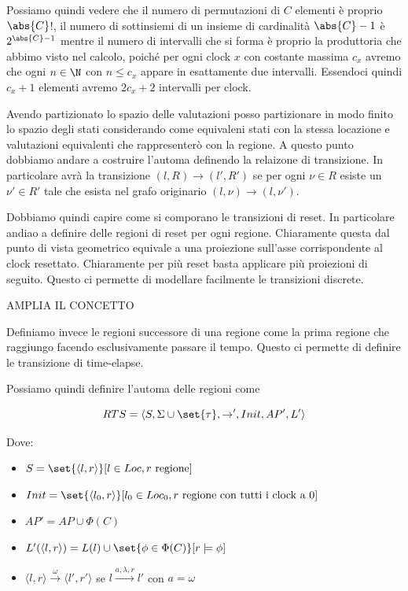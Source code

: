 Possiamo quindi vedere che il numero di permutazioni di \(C\) elementi è proprio \(\abs{C}\)!, il numero di sottinsiemi di un insieme di cardinalità \(\abs{C}-1\) è \(2^{\abs{C}-1}\) mentre il numero di intervalli che si forma è proprio la produttoria che abbimo visto nel calcolo, poiché per ogni clock \(x\) con costante massima \(c_x\) avremo che ogni \(n \in \N\) con \(n\leq c_x\) appare in esattamente due intervalli. Essendoci quindi \(c_x +1\) elementi avremo \(2c_x +2\) intervalli per clock.

Avendo partizionato lo spazio delle valutazioni posso partizionare in modo finito lo spazio degli stati considerando come equivaleni stati con la stessa locazione e valutazioni equivalenti che rappresenterò con la regione. A questo punto dobbiamo andare a costruire l'automa definendo la relaizone di transizione. In particolare avrà la transizione \((l,R)\to(l',R')\) se per ogni \(\nu \in R\) esiste un \(\nu' \in R'\) tale che esista nel grafo originario \((l,\nu)\to (l,\nu')\).

Dobbiamo quindi capire come si comporano le transizioni di reset. In particolare andiao a definire delle regioni di reset per ogni regione. Chiaramente questa dal punto di vista geometrico equivale a una proiezione sull'asse corrispondente al clock resettato. Chiaramente per più reset basta applicare più proiezioni di seguito. Questo ci permette di modellare facilmente le transizioni discrete.

AMPLIA IL CONCETTO

Definiamo invece le regioni successore di una regione come la prima regione che raggiungo facendo esclusivamente passare il tempo.
Questo ci permette di definire le transizione di time-elapse.

Possiamo quindi definire l'automa delle regioni come 

\[RTS =\langle S,\Sigma\cup\set{\tau}, \to', Init, AP', L'\rangle\]

Dove:

\begin{itemize}
  \item \(S = \set{\langle l,r\rangle}[l \in Loc, r \text{ regione}]\)
  \item \(Init = \set{\langle l_0, r\rangle}[l_0 \in Loc_0, r \text{ regione con tutti i clock a } 0]\)
  \item \(AP' = AP\cup \Phi(C)\) 
  \item \(L'(\langle l,r\rangle) = L(l)\cup \set{\phi \in \Phi(C)}[r \models \phi]\)
  \item \(\langle l,r\rangle \xrightarrow{\omega} \langle l',r'\rangle\) se \(l \xrightarrow{a,\lambda,r} l'\) con \(a = \omega\)
\end{itemize}

